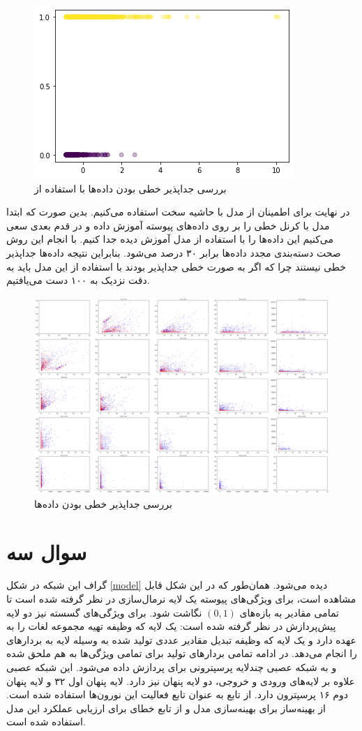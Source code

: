 \documentclass[12pt, a4paper]{article}
\begin{document}
\begin{figure}[h]
    \centering
    \includegraphics[width=0.4\linewidth]{images/lda.png}
    \caption{بررسی جداپذیر خطی بودن داده‌ها با استفاده از }
    \label{lda}
\end{figure}

در نهایت برای اطمینان از مدل  با حاشیه سخت استفاده می‌کنیم.
بدین صورت که ابتدا مدل  با کرنل خطی را بر روی داده‌های پیوسته آموزش داده و در قدم بعدی
سعی می‌کنیم این داده‌ها را با استفاده از مدل آموزش دیده جدا کنیم. با انجام این روش صحت دسته‌بندی مجدد
داده‌ها برابر ۳۰ درصد می‌شود. بنابراین نتیجه داده‌ها جداپذیر خطی نیستند چرا که اگر به صورت خطی جداپذیر
بودند با استفاده از این مدل باید به دقت نزدیک به ۱۰۰ دست می‌یافتیم.

\begin{figure}[h]
    \centering
    \includegraphics[width=0.8\linewidth]{images/linear.png}
    \caption{بررسی جداپذیر خطی بودن داده‌ها}
    \label{linear}
\end{figure}

\clearpage

\section*{سوال سه}

گراف این شبکه در شکل \ref{model} دیده می‌شود. همان‌طور که در این شکل قابل مشاهده است،
برای ویژگی‌های پیوسته یک لایه نرمال‌سازی در نظر گرفته شده است تا تمامی مقادیر به بازه‌های
$(0,1)$ نگاشت شود. برای ویژگی‌های گسسته نیز دو لایه پیش‌پردازش در نظر گرفته شده است:
یک لایه  که وظیفه تهیه مجموعه لغات را به عهده دارد و یک لایه
 که وظیفه تبدیل مقادیر عددی تولید شده به وسیله لایه 
به بردار‌های  را انجام می‌دهد. در ادامه تمامی بردار‌های تولید برای تمامی ویژگی‌ها
به هم ملحق شده و به شبکه عصبی چندلایه پرسپترونی برای پردازش داده می‌شود. این شبکه عصبی
علاوه بر لایه‌های ورودی و خروجی، دو لایه پنهان نیز دارد. لایه پنهان اول ۳۲ و لایه پنهان دوم
۱۶ پرسپترون دارد. از تابع  به عنوان تابع فعالیت این نورون‌ها استفاده شده است.
از بهینه‌ساز  برای بهینه‌سازی مدل و از تابع خطای  برای ارزیابی
عملکرد این مدل استفاده شده است.
\end{document}
